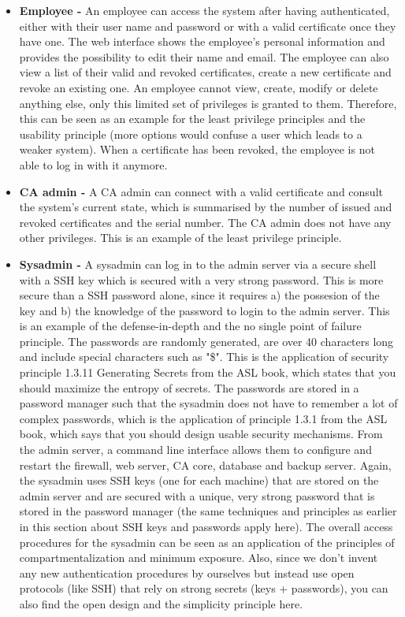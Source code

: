 \documentclass[english]{article}
\begin{document}
\begin{itemize}
  \item \textbf{Employee - } An employee can access the system after having authenticated, either with their user name and password or with a valid certificate once they have one. The web interface shows the employee's personal information and provides the possibility to edit their name and email. The employee can also view a list of their valid and revoked certificates, create a new certificate and revoke an existing one. An employee cannot view, create, modify or delete anything else, only this limited set of privileges is granted to them. Therefore, this can be seen as an example for the least privilege principles and the usability principle (more options would confuse a user which leads to a weaker system). When a certificate has been revoked, the employee is not able to log in with it anymore.
  \item \textbf{CA admin - } A CA admin can connect with a valid certificate and consult the system's current state, which is summarised by the number of issued and revoked certificates and the serial number. The CA admin does not have any other privileges. This is an example of the least privilege principle.
  \item \textbf{Sysadmin - } A sysadmin can log in to the admin server via a secure shell with a SSH key which is secured with a very strong password. This is more secure than a SSH password alone, since it requires a) the possesion of the key and b) the knowledge of the password to login to the admin server. This is an example of the defense-in-depth and the no single point of failure principle. The passwords are randomly generated, are over 40 characters long and include special characters such as "\$". This is the application of security principle 1.3.11 Generating Secrets from the ASL book, which states that you should maximize the entropy of secrets. The passwords are stored in a password manager such that the sysadmin does not have to remember a lot of complex passwords, which is the application of principle 1.3.1 from the ASL book, which says that you should design usable security mechanisms. From the admin server, a command line interface allows them to configure and restart the firewall, web server, CA core, database and backup server. Again, the sysadmin uses SSH keys (one for each machine) that are stored on the admin server and are secured with a unique, very strong password that is stored in the password manager (the same techniques and principles as earlier in this section about SSH keys and passwords apply here). The overall access procedures for the sysadmin can be seen as an application of the principles of compartmentalization and minimum exposure. Also, since we don't invent any new authentication procedures by ourselves but instead use open protocols (like SSH) that rely on strong secrets (keys + passwords), you can also find the open design and the simplicity principle here.
\end{itemize}
\end{document}
